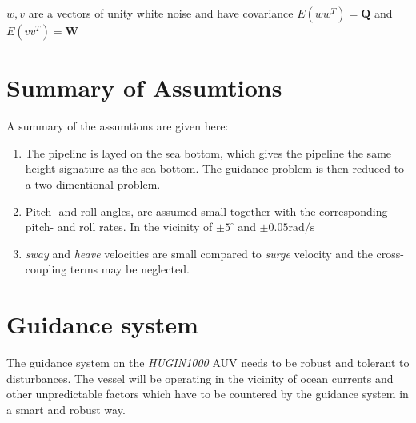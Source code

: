 	$w, v$ are a vectors of unity white noise and have covariance $E(ww^T) = \mathbf{Q}$ and $E(vv^T) =
	\mathbf{W}$


\section{Summary of Assumtions}
	A summary of the assumtions are given here:
	\begin{enumerate}
		\item The pipeline is layed on the sea bottom, which gives the pipeline the same
		height signature as the sea bottom. The guidance problem is then reduced to a
		two-dimentional problem.
		\item Pitch- and roll angles, are assumed small together with the corresponding pitch- and
		roll rates. In the vicinity of $\pm 5^{\circ}$ and $\pm 0.05 \mathrm{rad/s}$
		\item \textit{sway} and \textit{heave} velocities are small compared to \textit{surge}
		velocity and the cross-coupling terms may be neglected.
	\end{enumerate}
		
\section{Guidance system}
	The guidance system on the \textit{HUGIN1000} AUV needs to be robust and tolerant to disturbances. The 
	vessel will be operating in the vicinity of ocean currents and other unpredictable factors which have to 
	be countered by the guidance system in a smart and robust way.
	

